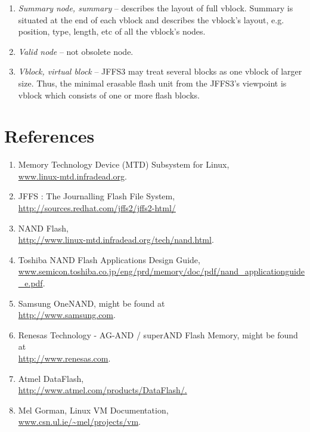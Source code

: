 \documentclass[12pt,a4paper,oneside,titlepage]{article}
\begin{document}
\begin{enumerate}
\item \emph{Summary node, summary} --
describes the layout of full vblock. Summary is  situated at the end
of each vblock and describes the vblock's layout, e.g. position, type,
length, etc of all the vblock's nodes.

\item \emph{Valid node} -- not obsolete node.

\item \emph{Vblock, virtual block} --
JFFS3 may treat several blocks as one vblock of larger size.
Thus, the minimal erasable flash unit from the JFFS3's viewpoint
is vblock which consists of one or more flash blocks.

\end{enumerate}

%
%
\section{References}

\begin{enumerate}
\item \raggedright \label{ref_MTD}
Memory Technology Device (MTD) Subsystem for Linux,\\
\url{www.linux-mtd.infradead.org}.

\item \raggedright \label{ref_JFFSdwmw2}
JFFS : The Journalling Flash File System,\\
\url{http://sources.redhat.com/jffs2/jffs2-html/}

\item \raggedright \label{ref_NANDMTD}
NAND Flash,\\
\url{http://www.linux-mtd.infradead.org/tech/nand.html}.

\item \raggedright \label{ref_ToshibaNAND}
Toshiba NAND Flash Applications Design Guide,\\
\url{www.semicon.toshiba.co.jp/eng/prd/memory/doc/pdf/nand\_applicationguide\_e.pdf}.

\item \raggedright \label{ref_SamsungOneNAND}
Samsung OneNAND, might be found at\\
\url{http://www.samsung.com}.

\item \raggedright \label{ref_RenesasAND}
Renesas Technology - AG-AND / superAND Flash Memory, might be found at\\
\url{http://www.renesas.com}.

\item \raggedright \label{ref_AtmelDataFlash}
Atmel DataFlash,\\
\url{http://www.atmel.com/products/DataFlash/.}

\item \raggedright \label{ref_GormanVM}
Mel Gorman, Linux VM Documentation,\\
\url{www.csn.ul.ie/~mel/projects/vm}.

\end{enumerate}
\end{document}
